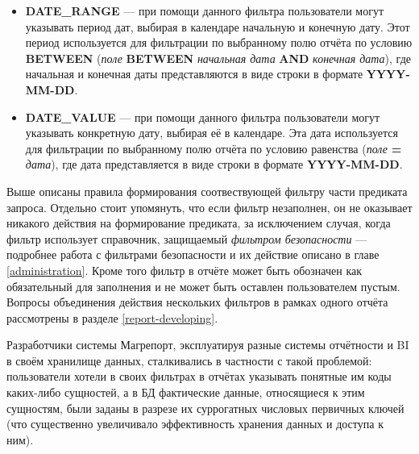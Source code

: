 \documentclass[../user-manual.tex]{subfiles}
\begin{document}
\begin{itemize}
		\item \textbf{DATE\_RANGE} --- при помощи данного фильтра пользователи могут указывать период дат, выбирая в календаре начальную и конечную дату. Этот период используется для фильтрации по выбранному полю отчёта по условию \textbf{BETWEEN} (\textit{поле} \textbf{BETWEEN} \textit{начальная дата} \textbf{AND} \textit{конечная дата}), где начальная и конечная даты представляются в виде строки в формате \textbf{YYYY-MM-DD}.
		
		\item \textbf{DATE\_VALUE}	--- при помощи данного фильтра пользователи могут указывать конкретную дату, выбирая её в календаре. Эта дата используется для фильтрации по выбранному полю отчёта по условию равенства (\textit{поле} \textbf{=} \textit{дата}), где дата представляется в виде строки в формате \textbf{YYYY-MM-DD}.
		
	\end{itemize}

	Выше описаны правила формирования соотвествующей фильтру части предиката запроса. Отдельно стоит упомянуть, что если фильтр незаполнен, он не оказывает никакого действия на формирование предиката, за исключением случая, когда фильтр использует справочник, защищаемый \textit{фильтром безопасности} --- подробнее работа с фильтрами безопасности и их действие описано в главе \ref{administration}. Кроме того фильтр в отчёте может быть обозначен как обязательный для заполнения и не может быть оставлен пользователем пустым. Вопросы объединения действия нескольких фильтров в рамках одного отчёта рассмотрены в разделе \ref{report-developing}.

	\begin{concept}
		Разработчики системы Магрепорт, эксплуатируя разные системы отчётности и BI в своём хранилище данных, сталкивались в частности с такой проблемой: пользователи хотели в своих фильтрах в отчётах указывать понятные им коды каких-либо сущностей, а в БД фактические данные, относящиеся к этим сущностям, были заданы в разрезе их суррогатных числовых первичных ключей (что существенно увеличивало эффективность хранения данных и доступа к ним). 
	\end{concept}
\end{document}
